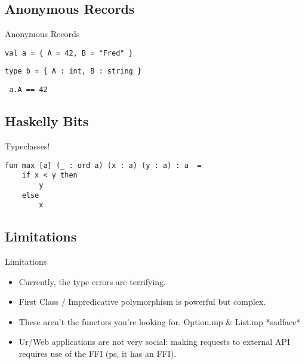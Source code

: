 \documentclass[aspectratio=169]{beamer}
\begin{document}
\subsection{Anonymous Records}
\begin{frame}[fragile]{Anonymous Records}
\begin{verbatim}
val a = { A = 42, B = "Fred" }
\end{verbatim}
\begin{verbatim}
type b = { A : int, B : string }
\end{verbatim}
\begin{verbatim} a.A == 42 \end{verbatim}
\end{frame}

\subsection{Haskelly Bits}
\begin{frame}[fragile]{Typeclasses!}
\begin{verbatim}
fun max [a] (_ : ord a) (x : a) (y : a) : a  =
    if x < y then
        y
    else
        x
\end{verbatim}
\end{frame}

\subsection{Limitations}
\begin{frame}[fragile]{Limitations}
\begin{itemize}
\item Currently, the type errors are terrifying.
\item First Class / Impredicative polymorphism is powerful but complex.
\item These aren't the functors you're looking for. Option.mp \& List.mp *sadface*
\item Ur/Web applications are not very social: making requests to external API requires use of the FFI (ps, it has an FFI).
\end{itemize}
\end{frame}
\end{document}
